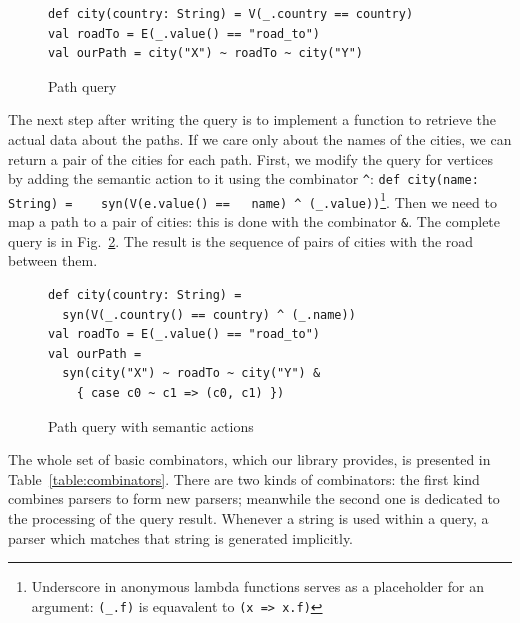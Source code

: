 \begin{figure}[h]
\begin{lstlisting}
def city(country: String) = V(_.country == country)
val roadTo = E(_.value() == "road_to")
val ourPath = city("X") ~ roadTo ~ city("Y")
\end{lstlisting}
\caption{Path query}
\label{fig:simpleQuery}
\end{figure}

The next step after writing the query is to implement a function to retrieve the actual data about the paths.
If we care only about the names of the cities, we can return a pair of the cities for each path.
First, we modify the query for vertices by adding the semantic action to it using the combinator \lstinline{^}: \lstinline{def city(name: String) =    syn(V(e.value() ==   name) ^ (_.value))}\footnote{Underscore in anonymous lambda functions serves as a placeholder for an argument: \lstinline{(_.f)} is equavalent to \lstinline{(x => x.f)} }.
Then we need to map a path to a pair of cities: this is done with the combinator \lstinline{&}.
The complete query is in Fig.~\ref{fig:simpleQueryV2}.
The result is the sequence of pairs of cities with the road between them.

\begin{figure}[h]
\begin{lstlisting}
def city(country: String) =
  syn(V(_.country() == country) ^ (_.name))
val roadTo = E(_.value() == "road_to")
val ourPath =
  syn(city("X") ~ roadTo ~ city("Y") &
    { case c0 ~ c1 => (c0, c1) })
\end{lstlisting}
\caption{Path query with semantic actions}
\label{fig:simpleQueryV2}
\end{figure}


The whole set of basic combinators, which our library provides, is presented in Table~\ref{table:combinators}.
There are two kinds of combinators: the first kind combines parsers to form new parsers; meanwhile the second one is dedicated to the processing of the query result.
Whenever a string is used within a query, a parser which matches that string is generated implicitly.

